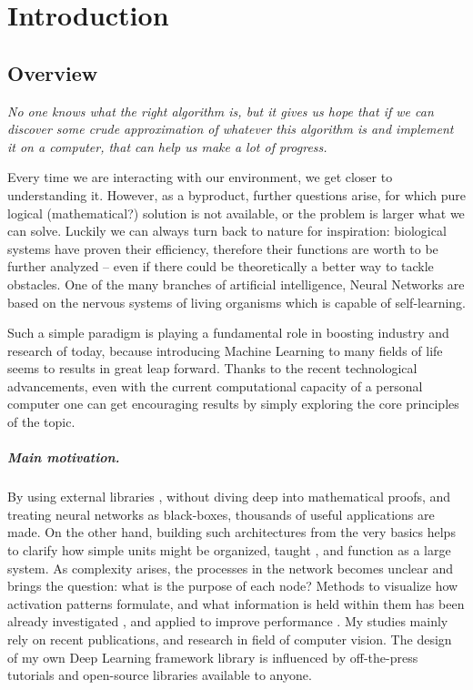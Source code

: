 \chapter{Introduction}
\section{Overview}


\epigraph{\textit{No one knows what the right algorithm is, but it gives us hope that if we can discover some crude approximation of whatever this algorithm is and implement it on a computer, that can help us make a lot of progress.}}{}

Every time we are interacting with our environment, we get closer to understanding it. %
However, as a byproduct, further questions arise, for which pure logical (mathematical?) solution is not available, or the problem is larger what we can solve.
Luckily we can always turn back to nature for inspiration: biological systems have proven their efficiency, therefore their functions are worth to be further analyzed -- even if there could be theoretically a better way to tackle obstacles. 
One of the many branches of artificial intelligence, Neural Networks are based on the nervous systems of living organisms which is capable of self-learning.

Such a simple paradigm is playing a fundamental role in boosting 
industry and research of today, because introducing Machine Learning to many fields of life seems to results in great leap forward. 
Thanks to the recent technological advancements, even with the current computational capacity of a personal computer one can get encouraging results by simply exploring the core principles of the topic.

\paragraph{Main motivation.} By using external libraries \cite{TF, torch, caffe}, without diving deep into mathematical proofs, and treating neural networks as black-boxes, thousands of useful applications \cite{haykin2004comprehensive} are made. 
On the other hand, building such architectures from the very basics helps to clarify how simple units might be organized, taught \cite{werbos1994roots}, and function \cite{hornik1989multilayer} as a large system. 
As complexity arises, the processes in the network becomes unclear and brings the question: what is the purpose of each node? 
Methods to visualize how activation patterns formulate, and what information is held within them has been already investigated \cite{yosinski2015understanding}, and applied to improve performance \cite{zeiler2014visualizing}. 
My studies mainly rely on recent publications, and research in field of computer vision. The design of my own Deep Learning framework library is influenced by off-the-press tutorials \cite{Goodfellow-et-al-2016-Book, deeplearningdotnet, nnsdl, stanfordlectures, gibiansky} and open-source libraries \cite{TF, torch, caffe} available to anyone. 

